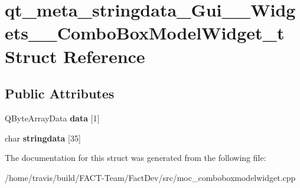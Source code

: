 \hypertarget{structqt__meta__stringdata__Gui____Widgets____ComboBoxModelWidget__t}{\section{qt\-\_\-meta\-\_\-stringdata\-\_\-\-Gui\-\_\-\-\_\-\-Widgets\-\_\-\-\_\-\-Combo\-Box\-Model\-Widget\-\_\-t Struct Reference}
\label{structqt__meta__stringdata__Gui____Widgets____ComboBoxModelWidget__t}
}
\subsection*{Public Attributes}
\begin{DoxyCompactItemize}
\item 
\hypertarget{structqt__meta__stringdata__Gui____Widgets____ComboBoxModelWidget__t_a8f06462505137645218fee19a35791d8}{Q\-Byte\-Array\-Data {\bfseries data} \mbox{[}1\mbox{]}}\label{structqt__meta__stringdata__Gui____Widgets____ComboBoxModelWidget__t_a8f06462505137645218fee19a35791d8}

\item 
\hypertarget{structqt__meta__stringdata__Gui____Widgets____ComboBoxModelWidget__t_a430099121554934669b55beb08c2039f}{char {\bfseries stringdata} \mbox{[}35\mbox{]}}\label{structqt__meta__stringdata__Gui____Widgets____ComboBoxModelWidget__t_a430099121554934669b55beb08c2039f}

\end{DoxyCompactItemize}


The documentation for this struct was generated from the following file\-:\begin{DoxyCompactItemize}
\item 
/home/travis/build/\-F\-A\-C\-T-\/\-Team/\-Fact\-Dev/src/moc\-\_\-comboboxmodelwidget.\-cpp\end{DoxyCompactItemize}
